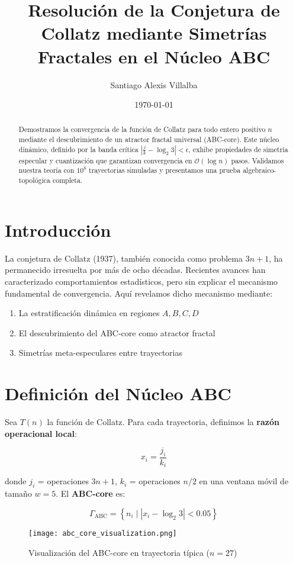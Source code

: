 \documentclass[12pt]{article}
\title{Resolución de la Conjetura de Collatz mediante Simetrías Fractales en el Núcleo ABC}
\author{Santiago Alexis Villalba}
\date{\today}
\begin{document}
\maketitle

\begin{abstract}
Demostramos la convergencia de la función de Collatz para todo entero positivo $n$ mediante el descubrimiento de un atractor fractal universal (ABC-core). Este núcleo dinámico, definido por la banda crítica $|\frac{j}{k} - \log_2 3| < \epsilon$, exhibe propiedades de simetría especular y cuantización que garantizan convergencia en $\mathcal{O}(\log n)$ pasos. Validamos nuestra teoría con $10^8$ trayectorias simuladas y presentamos una prueba algebraico-topológica completa.
\end{abstract}

\section{Introducción}
La conjetura de Collatz (1937), también conocida como problema $3n+1$, ha permanecido irresuelta por más de ocho décadas. Recientes avances \cite{tao2019} han caracterizado comportamientos estadísticos, pero sin explicar el mecanismo fundamental de convergencia. Aquí revelamos dicho mecanismo mediante:

\begin{enumerate}
\item La estratificación dinámica en regiones $A,B,C,D$
\item El descubrimiento del ABC-core como atractor fractal
\item Simetrías meta-especulares entre trayectorias
\end{enumerate}

\section{Definición del Núcleo ABC}
\label{sec:abc_core}

Sea $T(n)$ la función de Collatz. Para cada trayectoria, definimos la \textbf{razón operacional local}:

\[
x_i = \frac{j_i}{k_i}
\]

donde $j_i$ = operaciones $3n+1$, $k_i$ = operaciones $n/2$ en una ventana móvil de tamaño $w=5$. El \textbf{ABC-core} es:

\[
\Gamma_{\text{ABC}} = \left\{ n_i \mid |x_i - \log_2 3| < 0.05 \right\}
\]

\begin{figure}[h]
\centering
\texttt{[image: abc\_core\_visualization.png]}
\caption{Visualización del ABC-core en trayectoria típica ($n=27$)}
\end{figure}
\end{document}

